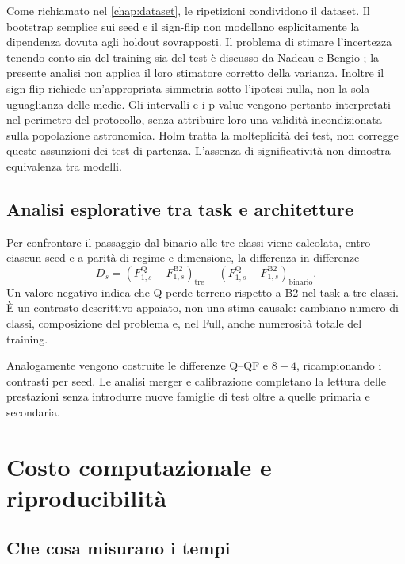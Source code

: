 Come richiamato nel \cref{chap:dataset}, le ripetizioni condividono
il dataset. Il bootstrap semplice sui seed e il sign-flip non
modellano esplicitamente la dipendenza dovuta agli holdout
sovrapposti. Il problema di stimare l'incertezza tenendo conto sia
del training sia del test è discusso da Nadeau e Bengio
\cite{nadeau2003inference}; la presente analisi non applica il loro
stimatore corretto della varianza. Inoltre il sign-flip richiede
un'appropriata simmetria
sotto l'ipotesi nulla, non la sola uguaglianza delle medie.
Gli intervalli e i p-value vengono pertanto interpretati nel perimetro
del protocollo, senza attribuire loro una validità incondizionata
sulla popolazione astronomica. Holm tratta la molteplicità dei test,
non corregge queste assunzioni dei test di partenza.
L'assenza di significatività non dimostra equivalenza tra modelli.

\subsection{Analisi esplorative tra task e architetture}

Per confrontare il passaggio dal binario alle tre classi viene calcolata,
entro ciascun seed e a parità di regime e dimensione, la
differenza-in-differenze
\begin{equation}
 D_s=
 \left(F^{\mathrm Q}_{1,s}-F^{\mathrm{B2}}_{1,s}\right)_{\mathrm{tre}}
 -
 \left(F^{\mathrm Q}_{1,s}-F^{\mathrm{B2}}_{1,s}\right)_{\mathrm{binario}}.
 \label{eq:did}
\end{equation}
Un valore negativo indica che Q perde terreno rispetto a B2 nel task
a tre classi. È un contrasto descrittivo appaiato, non una stima causale:
cambiano numero di classi, composizione del problema e, nel Full,
anche numerosità totale del training.

Analogamente vengono costruite le differenze Q--QF e \(8-4\),
ricampionando i contrasti per seed. Le analisi merger e calibrazione
completano la lettura delle prestazioni senza introdurre nuove
famiglie di test oltre a quelle primaria e secondaria.

\section{Costo computazionale e riproducibilità}
\label{sec:costo-riproducibilita}

\subsection{Che cosa misurano i tempi}


